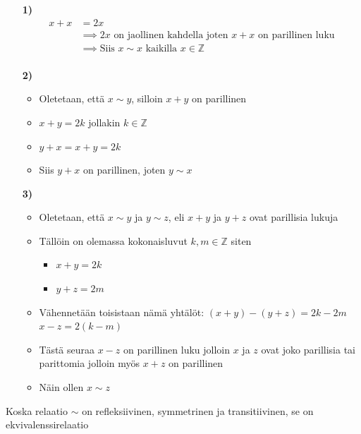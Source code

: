 \documentclass{article}
\begin{document}
        \begin{itemize}
            \item[\textbf{1)}]
            \[
                \begin{aligned}
                    x + x &= 2x\\
                    &\implies 2x \text{ on jaollinen kahdella joten $x + x$  on parillinen luku} \\
                    &\implies \text{Siis $x \sim x$ kaikilla } x \in \mathbb{Z} \\[5pt]
                \end{aligned}
            \]

            \item[\textbf{2)}]
            \begin{itemize}
                \item Oletetaan, että $x \sim y$, silloin $x + y$ on parillinen
                \item $x + y = 2k$ jollakin $k \in \mathbb{Z}$
                \item $y + x = x + y = 2k$
                \item Siis $y + x$ on parillinen, joten $y \sim x$
            \end{itemize}

            \item[\textbf{3)}]
            \begin{itemize}
                \item Oletetaan, että $x \sim y$ ja $y \sim z$, eli $x + y$ ja $y + z$ ovat parillisia lukuja
                \item Tällöin on olemassa kokonaisluvut $k, m \in \mathbb{Z}$ siten
                \begin{itemize}
                    \item $x + y = 2k$
                    \item $y + z = 2m$
                \end{itemize}
                \item Vähennetään toisistaan nämä yhtälöt:\newline
                    $(x + y) - (y + z) = 2k - 2m$ \newline
                    $x - z = 2(k - m)$
                \item Tästä seuraa $x - z$ on parillinen luku jolloin $x$ ja $z$ ovat joko parillisia tai parittomia jolloin myös $x + z$ on parillinen
                \item Näin ollen $x \sim z$
            \end{itemize}
        \end{itemize}
        Koska relaatio $\sim$ on refleksiivinen, symmetrinen ja transitiivinen, se on ekvivalenssirelaatio
\end{document}
